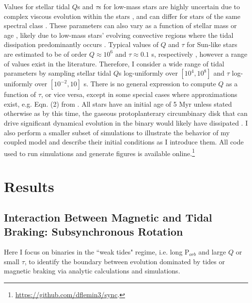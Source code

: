 Values for stellar tidal $Q$s and $\tau$s for low-mass stars are highly uncertain due to complex viscous evolution within the stars \citep{Ogilvie2007}, and can differ for stars of the same spectral class \citep{Barker2009}. These parameters can also vary as a function of stellar mass or age \citep{Bolmont2016,vanEylen2016}, likely due to low-mass stars' evolving convective regions where the tidal dissipation predominantly occurs \citep{Zahn2008}. Typical values of $Q$ and $\tau$ for Sun-like stars are estimated to be of order $Q \approx 10^6$ and $\tau \approx 0.1$ s, respectively \citep[e.g.][]{Meibom2005,Ogilvie2007,Jackson2008}, however a range of values exist in the literature.  Therefore, I consider a wide range of tidal parameters by sampling stellar tidal $Q$s log-uniformly over $[10^4,10^8]$ and $\tau$ log-uniformly over $[10^{-2},10]$ s.  There is no general expression to compute $Q$ as a function of $\tau$, or vice versa, except in some special cases where approximations exist, e.g. Eqn. (2) from \citet{Heller2011}. All stars have an initial age of 5 Myr unless stated otherwise as by this time, the gaseous protoplanterary circumbinary disk that can drive significant dynamical evolution in the binary \citep[e.g.][]{Fleming2017} would likely have dissipated \citep{Haisch2001}. I also perform a smaller subset of simulations to illustrate the behavior of my coupled model and describe their initial conditions as I introduce them. All code used to run simulations and generate figures is available online.\footnote{\href{https://github.com/dflemin3/sync}{https://github.com/dflemin3/sync}.}



\section{Results} \label{sync:sec:results}

\subsection{Interaction Between Magnetic and Tidal Braking: Subsynchronous Rotation} \label{sync:sec:eq}

Here I focus on binaries in the ``weak tides" regime, i.e. long P$_{orb}$ and large $Q$ or small $\tau$, to identify the boundary between evolution dominated by tides or magnetic braking via analytic calculations and simulations.  

